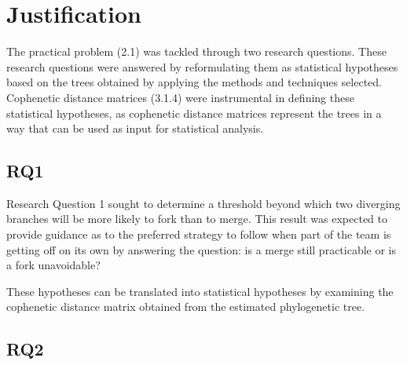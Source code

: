 
\section{Justification}
The practical problem (2.1) was tackled through two research questions. These research questions were answered by reformulating them as statistical hypotheses based on the trees obtained by applying the methods and techniques selected. Cophenetic distance matrices (3.1.4) were instrumental in defining these statistical hypotheses, as cophenetic distance matrices represent the trees in a way that can be used as input for statistical analysis.

\subsection{RQ1}
Research Question 1 sought to determine a threshold beyond which two diverging branches will be more likely to fork than to merge. This result was expected to provide guidance as to the preferred strategy to follow when part of the team is getting off on its own by answering the question: is a merge still practicable or is a fork unavoidable?



\noindent
These hypotheses can be translated into statistical hypotheses by examining the cophenetic distance matrix obtained from the estimated phylogenetic tree.



\subsection{RQ2}
\label{methodology_rq2}

